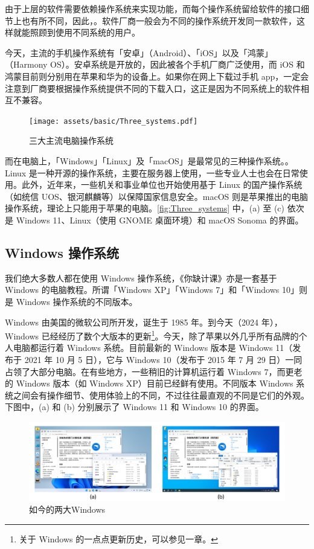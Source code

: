 由于上层的软件需要依赖操作系统来实现功能，而每个操作系统留给软件的接口细节上也有所不同，因此，。软件厂商一般会为不同的操作系统开发同一款软件，这样就能照顾到使用不同系统的用户。

今天，主流的手机操作系统有「安卓」（Android）、「iOS」以及「鸿蒙」（Harmony OS）。安卓系统是开放的，因此被各个手机厂商广泛使用，而 iOS 和鸿蒙目前则分别用在苹果和华为的设备上。如果你在网上下载过手机 app，一定会注意到厂商要根据操作系统提供不同的下载入口，这正是因为不同系统上的软件相互不兼容。

\begin{figure}[htb!]
  \centering
  \texttt{[image: assets/basic/Three\_systems.pdf]}
  \caption{三大主流电脑操作系统}
  \label{fig:Three_systems}
\end{figure}

而在电脑上，「Windows」「Linux」及「macOS」是最常见的三种操作系统。。Linux 是一种开源的操作系统，主要在服务器上使用，一些专业人士也会在日常使用。此外，近年来，一些机关和事业单位也开始使用基于 Linux 的国产操作系统（如统信 UOS、银河麒麟等）以保障国家信息安全。macOS 则是苹果推出的电脑操作系统，理论上只能用于苹果的电脑。\autoref{fig:Three_systems} 中，(a) 至 (c) 依次是 Windows 11、Linux（使用 GNOME 桌面环境）和 macOS Sonoma 的界面。

\subsection{Windows 操作系统}

我们绝大多数人都在使用 Windows 操作系统，《你缺计课》亦是一套基于 Windows 的电脑教程。所谓「Windows XP」「Windows 7」和「Windows 10」则是 Windows 操作系统的不同版本。

Windows 由美国的微软公司所开发，诞生于 1985 年。到今天（2024 年），Windows 已经经历了数个大版本的更新\footnote{关于 Windows 的一点点更新历史，可以参见一章。}。今天，除了苹果以外几乎所有品牌的个人电脑都运行着 Windows 系统。目前最新的 Windows 版本是 Windows 11（发布于 2021 年 10 月 5 日），它与 Windows 10（发布于 2015 年 7 月 29 日）一同占领了大部分电脑。在有些地方，一些稍旧的计算机运行着 Windows 7，而更老的 Windows 版本（如 Windows XP）目前已经鲜有使用。不同版本 Windows 系统之间会有操作细节、使用体验上的不同，不过往往最直观的不同是它们的外观。下图中，(a) 和 (b) 分别展示了 Windows 11 和 Windows 10 的界面。

\begin{figure}[htb!]
  \centering
  \includegraphics[width=.95\textwidth]{assets/basic/Win_11_and_10.pdf}
  \caption{如今的两大Windows}
  \label{fig:Win_11_and_10}
\end{figure}


